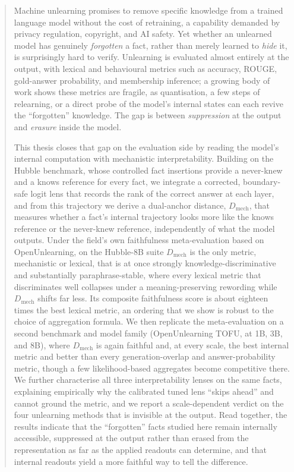 \begin{abstract}
Machine unlearning promises to remove specific knowledge from a trained language model without the cost of
retraining, a capability demanded by privacy regulation, copyright, and AI safety. Yet whether an unlearned
model has genuinely \emph{forgotten} a fact, rather than merely learned to \emph{hide} it, is
surprisingly hard to verify. Unlearning is evaluated almost entirely at the output, with lexical and
behavioural metrics such as accuracy, ROUGE, gold-answer probability, and membership inference; a growing
body of work shows these metrics are fragile, as quantisation, a few steps of relearning, or a direct probe
of the model's internal states can each revive the ``forgotten'' knowledge. The gap is between
\emph{suppression} at the output and \emph{erasure} inside the model.

This thesis closes that gap on the evaluation side by reading the model's internal computation with
mechanistic interpretability. Building on the Hubble benchmark, whose controlled fact insertions provide a
never-knew and a knows reference for every fact, we integrate a corrected, boundary-safe logit lens that
records the rank of the correct answer at each layer, and from this trajectory we derive a dual-anchor
distance, \(D_\text{mech}\), that measures whether a fact's internal trajectory looks more like the knows
reference or the never-knew reference, independently of what the model outputs. Under the field's own
faithfulness meta-evaluation based on OpenUnlearning, on the Hubble-8B suite \(D_\text{mech}\) is the only
metric, mechanistic or lexical, that is at once strongly knowledge-discriminative and substantially
paraphrase-stable, where every lexical metric that discriminates well collapses under a meaning-preserving
rewording while \(D_\text{mech}\) shifts far less. Its composite faithfulness score is about eighteen
times the best lexical metric, an ordering that we show is robust to the choice of aggregation formula. We
then replicate the meta-evaluation on a second benchmark and model family (OpenUnlearning TOFU, at 1B, 3B,
and 8B), where \(D_\text{mech}\) is again faithful and, at every scale, the best internal metric and better
than every generation-overlap and answer-probability metric, though a few likelihood-based aggregates
become competitive there. We further characterise all three interpretability lenses on the same facts,
explaining empirically why the calibrated tuned lens ``skips ahead'' and cannot ground the metric, and we
report a scale-dependent verdict on the four unlearning methods that is invisible at the output. Read
together, the results indicate that the ``forgotten'' facts studied here remain internally accessible,
suppressed at the output rather than erased from the representation as far as the applied readouts can
determine, and that internal readouts yield a more faithful way to tell the difference.
\end{abstract}
